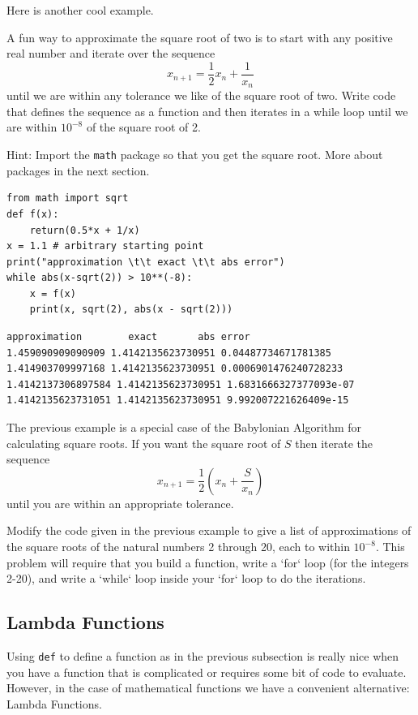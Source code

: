 \begin{example}
    Here is another cool example.

A fun way to approximate the square root of two is to start with any positive real number
and iterate over the sequence 
$$x_{n+1} = \frac{1}{2} x_n + \frac{1}{x_n}$$ 
until we are
within any tolerance we like of the square root of two.  Write code that defines the
sequence as a function and then iterates in a while loop until we are within $10^{-8}$ of
the square root of 2.  

Hint: Import the \texttt{math} package so that you get the square root.  More about
packages in the next section.

\bcode
\begin{lstlisting}
from math import sqrt
def f(x):
    return(0.5*x + 1/x)
x = 1.1 # arbitrary starting point
print("approximation \t\t exact \t\t abs error")
while abs(x-sqrt(2)) > 10**(-8):
    x = f(x)
    print(x, sqrt(2), abs(x - sqrt(2)))
\end{lstlisting}
\boutput
\begin{lstlisting}
approximation 		 exact 		 abs error
1.459090909090909 1.4142135623730951 0.04487734671781385
1.414903709997168 1.4142135623730951 0.0006901476240728233
1.4142137306897584 1.4142135623730951 1.6831666327377093e-07
1.4142135623731051 1.4142135623730951 9.992007221626409e-15
\end{lstlisting}
\end{example}

\begin{problem}\label{prob_python:babylonian_sqrt}
    The previous example is a special case of the Babylonian Algorithm for calculating square roots.  If you want the square root of $S$ then iterate the sequence
$$x_{n+1} = \frac{1}{2} \left( x_n + \frac{S}{x_n} \right)$$
until you are within an appropriate tolerance.

Modify the code given in the previous example to give a list of approximations of the square roots of the natural numbers 2 through 20, each to within $10^{-8}$.  This problem will require that you build a function, write a `for` loop (for the integers 2-20), and write a `while` loop inside your `for` loop to do the iterations.
\end{problem}


\subsection{Lambda Functions}
Using \texttt{def} to define a function as in the previous subsection is really nice when
you have a function that is complicated or requires some bit of code to evaluate.
However, in the case of mathematical functions we have a convenient alternative: Lambda
Functions.  

